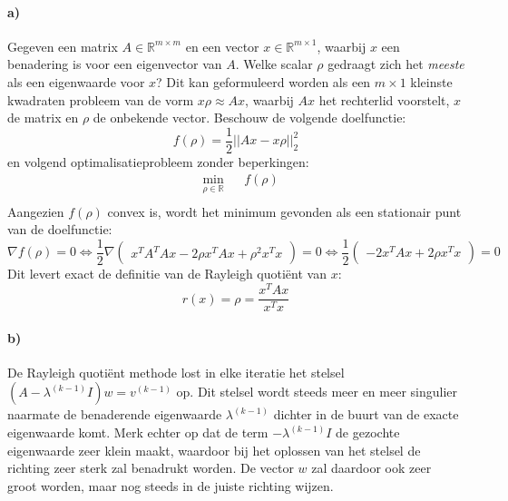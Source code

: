 \documentclass[a4paper, 12pt, titlepage]{report}
\begin{document}
\paragraph{a)} Gegeven een matrix $A \in \mathbb{R}^{m \times m}$ en een vector $x \in \mathbb{R}^{m \times 1}$, waarbij $x$ een benadering is voor een eigenvector van $A$. Welke scalar $\rho$ gedraagt zich het \emph{meeste} als een eigenwaarde voor $x$? Dit kan geformuleerd worden als een $m \times 1$ kleinste kwadraten probleem van de vorm $x \rho \approx Ax$, waarbij $Ax$ het rechterlid voorstelt, $x$ de matrix en $\rho$ de onbekende vector. Beschouw de volgende doelfunctie:
\begin{equation}
	f(\rho) = \frac{1}{2}|| Ax-x\rho ||^{2}_{2}
\end{equation}
en volgend optimalisatieprobleem zonder beperkingen:
\begin{equation}
\begin{aligned}
& \underset{\rho \in \mathbb{R}}{\text{min}}
& & f(\rho) \\
\end{aligned}
\end{equation}
Aangezien $f(\rho)$ convex is, wordt het minimum gevonden als een stationair punt van de doelfunctie:
\begin{equation}
	\nabla f(\rho) = 0 \Leftrightarrow \frac{1}{2}\nabla \begin{pmatrix} x^{T}A^{T}Ax - 2\rho x^{T}Ax + \rho^{2}x^{T}x \end{pmatrix} = 0 \Leftrightarrow \frac{1}{2} \begin{pmatrix} -2x^{T}Ax + 2\rho x^{T}x \end{pmatrix} = 0
\end{equation}
Dit levert exact de definitie van de Rayleigh quoti\"ent van $x$:
\begin{equation}
	r(x) = \rho = \frac{x^{T}Ax}{x^{T}x}
\end{equation}

\paragraph{b)} De Rayleigh quoti\"ent methode lost in elke iteratie het stelsel $(A-\lambda^{(k-1)}I)w = v^{(k-1)}$ op. Dit stelsel wordt steeds meer en meer singulier naarmate de benaderende eigenwaarde $\lambda^{(k-1)}$ dichter in de buurt van de exacte eigenwaarde komt. Merk echter op dat de term $-\lambda^{(k-1)}I$ de gezochte eigenwaarde zeer klein maakt, waardoor bij het oplossen van het stelsel de richting zeer sterk zal benadrukt worden. De vector $w$ zal daardoor ook zeer groot worden, maar nog steeds in de juiste richting wijzen. 
\end{document}

